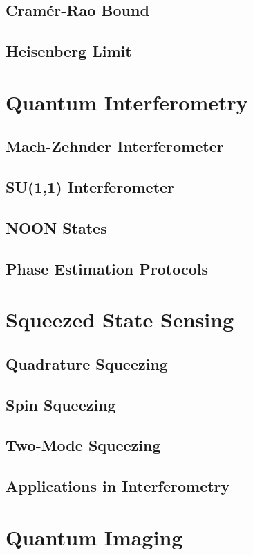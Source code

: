 \documentclass[12pt,a4paper]{book}
\begin{document}
\subsection{Cramér-Rao Bound}
\subsection{Heisenberg Limit}

\section{Quantum Interferometry}
\subsection{Mach-Zehnder Interferometer}
\subsection{SU(1,1) Interferometer}
\subsection{NOON States}
\subsection{Phase Estimation Protocols}

\section{Squeezed State Sensing}
\subsection{Quadrature Squeezing}
\subsection{Spin Squeezing}
\subsection{Two-Mode Squeezing}
\subsection{Applications in Interferometry}

\section{Quantum Imaging}
\end{document}
